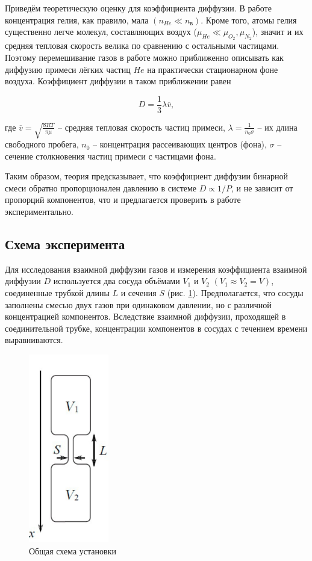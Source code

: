 \documentclass[12pt,a4paper]{article}
\begin{document}
Приведём теоретическую оценку для коэффициента диффузии. В работе концентрация гелия, как правило, мала $ (n_{He} \ll n_\text{в}) $. Кроме того, атомы гелия существенно легче молекул, составляющих воздух ($ \mu_{He} \ll \mu_{O_2}, \mu_{N_2} $), значит и их средняя тепловая скорость велика по сравнению с остальными частицами. Поэтому перемешивание газов в работе можно приближенно описывать как диффузию примеси лёгких частиц $ He $ на практически стационарном фоне воздуха. Коэффициент диффузии в таком приближении равен

\begin{equation}
D=\frac{1}{3}\lambda \overline{v},
\end{equation}

где $ \overline{v}=\sqrt{\frac{8RT}{\pi \mu}} $ -- средняя тепловая скорость частиц примеси, $ \lambda = \frac{1}{n_0\sigma} $ -- их длина свободного пробега, $ n_0 $ -- концентрация рассеивающих центров (фона), $ \sigma $ -- сечение столкновения частиц примеси с частицами фона.

Таким образом, теория предсказывает, что коэффициент диффузии бинарной смеси обратно пропорционален давлению в системе $ D \propto 1/P $, и не зависит от пропорций компонентов, что и предлагается проверить в работе экспериментально.

\subsection{Схема эксперимента}

Для исследования взаимной диффузии газов и измерения коэффициента взаимной диффузии $ D $ используется два сосуда объёмами $ V_1 $ и $ V_2 $ $ (V_1\approx V_2=V) $, соединенные трубкой длины $ L $ и сечения $ S $ (рис. \ref{ris1}). Предполагается, что сосуды заполнены смесью двух газов при одинаковом давлении, но с различной концентрацией компонентов. Вследствие взаимной диффузии, проходящей в соединительной трубке, концентрации компонентов в сосудах с течением времени выравниваются. 

\begin{figure}
	\includegraphics[width=3.5cm]{2.2.1_1}
	\caption{Общая схема установки}
	\label{ris1}
\end{figure}
\end{document}

